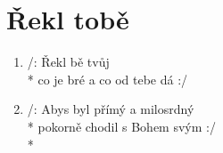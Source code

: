 \section{Řekl tobě}
\begin{enumerate}
\item /: Řekl bě tvůj  \\*
co je bré a co  od tebe dá :/ 
\item /: Abys byl přímý a milosrdný \\*
pokorně chodil s Bohem svým :/ \\*
\end{enumerate}
